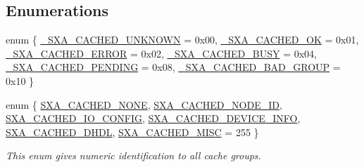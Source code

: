 \subsection*{Enumerations}
\begin{DoxyCompactItemize}
\item 
enum \{ \newline
\hyperlink{group___s_x_a_gga0411cd49bb5b71852cecd93bcbf0ca2da16320fc3c50be3823236003df46858b5}{\+\_\+\+S\+X\+A\+\_\+\+C\+A\+C\+H\+E\+D\+\_\+\+U\+N\+K\+N\+O\+WN} = 0x00, 
\hyperlink{group___s_x_a_gga0411cd49bb5b71852cecd93bcbf0ca2da54498f64b3ad7c2be423d32b45deac04}{\+\_\+\+S\+X\+A\+\_\+\+C\+A\+C\+H\+E\+D\+\_\+\+OK} = 0x01, 
\hyperlink{group___s_x_a_gga0411cd49bb5b71852cecd93bcbf0ca2da0d4d4f7cbf0ca196f444b164cb127413}{\+\_\+\+S\+X\+A\+\_\+\+C\+A\+C\+H\+E\+D\+\_\+\+E\+R\+R\+OR} = 0x02, 
\hyperlink{group___s_x_a_gga0411cd49bb5b71852cecd93bcbf0ca2da9f8ebeda64ea0f23a8db672978ddb13b}{\+\_\+\+S\+X\+A\+\_\+\+C\+A\+C\+H\+E\+D\+\_\+\+B\+U\+SY} = 0x04, 
\newline
\hyperlink{group___s_x_a_gga0411cd49bb5b71852cecd93bcbf0ca2da17a60752eacd20e0104ef906a4960437}{\+\_\+\+S\+X\+A\+\_\+\+C\+A\+C\+H\+E\+D\+\_\+\+P\+E\+N\+D\+I\+NG} = 0x08, 
\hyperlink{group___s_x_a_gga0411cd49bb5b71852cecd93bcbf0ca2da7d03e78354198ea487076fa69dd2658f}{\+\_\+\+S\+X\+A\+\_\+\+C\+A\+C\+H\+E\+D\+\_\+\+B\+A\+D\+\_\+\+G\+R\+O\+UP} = 0x10
 \}
\item 
enum \{ \newline
\hyperlink{group___s_x_a_ggabed82baf7f470b522273a3e37c24c600ae3f816f5c71d3395d2b2c034227bf14d}{S\+X\+A\+\_\+\+C\+A\+C\+H\+E\+D\+\_\+\+N\+O\+NE}, 
\hyperlink{group___s_x_a_ggabed82baf7f470b522273a3e37c24c600a8d6b7f78660e6b7da06d0fa99dfb6df6}{S\+X\+A\+\_\+\+C\+A\+C\+H\+E\+D\+\_\+\+N\+O\+D\+E\+\_\+\+ID}, 
\hyperlink{group___s_x_a_ggabed82baf7f470b522273a3e37c24c600a8f3afd72952b8d47c03b1c9c4ea76622}{S\+X\+A\+\_\+\+C\+A\+C\+H\+E\+D\+\_\+\+I\+O\+\_\+\+C\+O\+N\+F\+IG}, 
\hyperlink{group___s_x_a_ggabed82baf7f470b522273a3e37c24c600a689a1dccc7c16583fec02c8d8c7ba35d}{S\+X\+A\+\_\+\+C\+A\+C\+H\+E\+D\+\_\+\+D\+E\+V\+I\+C\+E\+\_\+\+I\+N\+FO}, 
\newline
\hyperlink{group___s_x_a_ggabed82baf7f470b522273a3e37c24c600a0ad9240e8ef31156d92883213e899924}{S\+X\+A\+\_\+\+C\+A\+C\+H\+E\+D\+\_\+\+D\+H\+DL}, 
\hyperlink{group___s_x_a_ggabed82baf7f470b522273a3e37c24c600a8110f7d71f749b08814ced492ca2bd71}{S\+X\+A\+\_\+\+C\+A\+C\+H\+E\+D\+\_\+\+M\+I\+SC} = 255
 \}\begin{DoxyCompactList}\small\item\em This enum gives numeric identification to all cache groups. \end{DoxyCompactList}
\end{DoxyCompactItemize}
